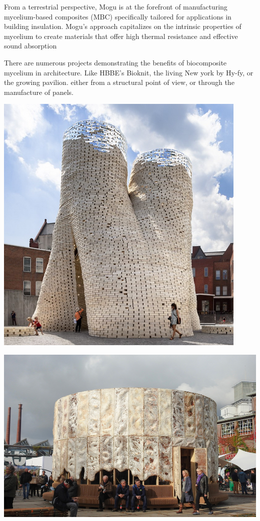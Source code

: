 From a terrestrial perspective, Mogu\cite{MoguMogu} is at the forefront of manufacturing mycelium-based composites (MBC) specifically tailored for applications in building insulation. Mogu’s approach capitalizes on the intrinsic properties of mycelium to create materials that offer high thermal resistance and effective sound absorption

There are numerous projects demonstrating the benefits of biocomposite mycelium in architecture. Like HBBE's Bioknit, the living New york by Hy-fy, or the growing pavilion\cite{thegrowingpavilion}. either from a structural point of view, or through the manufacture of panels.  

\begin{marginfigure}
    \centering
    \includegraphics{images/ThelivingNewYork_Hy-Fi.png}    
    \caption{}
    \label{fig:NY}
\end{marginfigure}

\begin{marginfigure}
    \centering
    \includegraphics{images/TGP.png}    
    \caption{}
    \label{fig:the living}
\end{marginfigure}

